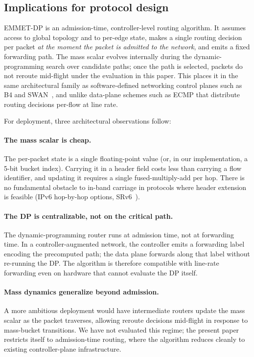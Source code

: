 \subsection{Implications for protocol design}
\label{subsec:protocol-implications}

EMMET-DP is an admission-time, controller-level routing
algorithm. It assumes access to global topology and to per-edge
state, makes a single routing decision per packet \emph{at the
moment the packet is admitted to the network}, and emits a fixed
forwarding path. The mass scalar evolves internally during the
dynamic-programming search over candidate paths; once the path
is selected, packets do not reroute mid-flight under the
evaluation in this paper. This places it in the same architectural family
as software-defined networking control planes such as B4 and
SWAN~\cite{jain2013b4,hong2013swan}, and unlike data-plane schemes
such as ECMP that distribute routing decisions per-flow at line
rate.

For deployment, three architectural observations follow:

\paragraph{The mass scalar is cheap.}
The per-packet state is a single floating-point value (or, in our
implementation, a 5-bit bucket index). Carrying it in a header
field costs less than carrying a flow identifier, and updating it
requires a single fused-multiply-add per hop. There is no
fundamental obstacle to in-band carriage in protocols where
header extension is feasible (IPv6 hop-by-hop options,
SRv6~\cite{filsfils2018srv6}).

\paragraph{The DP is centralizable, not on the critical path.}
The dynamic-programming router runs at admission time, not at
forwarding time. In a controller-augmented network, the controller
emits a forwarding label encoding the precomputed path; the data
plane forwards along that label without re-running the DP. The
algorithm is therefore compatible with line-rate forwarding even
on hardware that cannot evaluate the DP itself.

\paragraph{Mass dynamics generalize beyond admission.}
A more ambitious deployment would have intermediate routers update
the mass scalar as the packet traverses, allowing reroute decisions
mid-flight in response to mass-bucket transitions. We have not
evaluated this regime; the present paper restricts itself to
admission-time routing, where the algorithm reduces cleanly to
existing controller-plane infrastructure.

